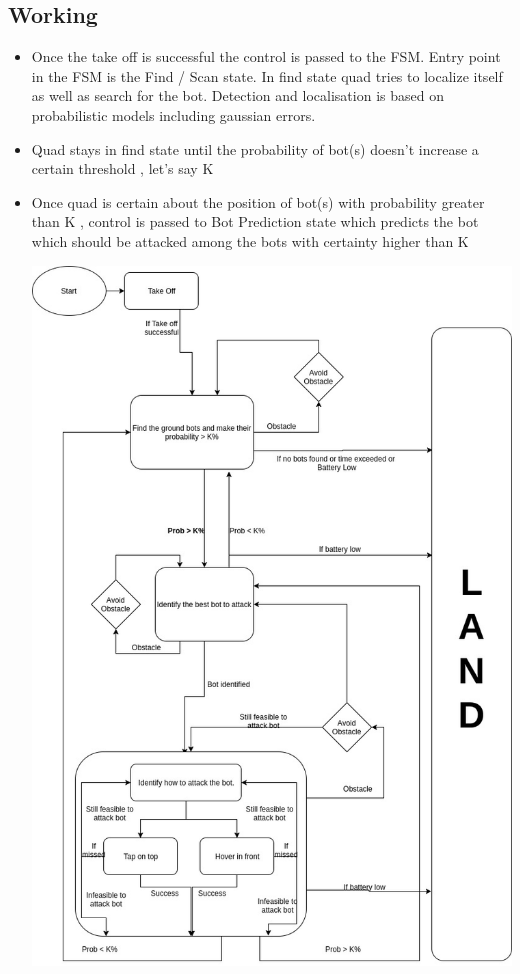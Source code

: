 \documentclass[12pt]{article}
\begin{document}
\begin{itemize}
\subsection{Working}
\begin{itemize}
\item{Once the take off is successful the control is passed to the FSM. Entry point in the FSM is the Find / Scan state. In find state quad tries to localize itself as well as search for the bot. Detection and localisation is based on probabilistic models including gaussian errors.
}
\item{Quad stays in find state until the probability of bot(s) doesn't increase a certain threshold , let's say K%
}
\item{Once quad is certain about the position of bot(s) with probability greater than K , control is passed to Bot Prediction state which predicts the bot which should be attacked among the bots with certainty higher than K%
}
\begin{center}
\includegraphics[scale=0.4]{st_mcn} \\

\end{center}
\end{itemize}
\end{itemize}
\end{document}
